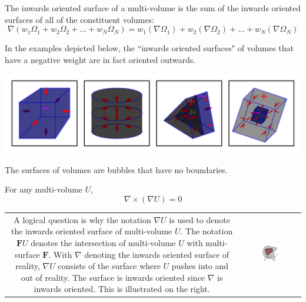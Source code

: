 The inwards oriented surface of a multi-volume is the sum of the inwards oriented surfaces of all of the constituent volumes:
\[\nabla (w_1 \Omega_1 + w_2 \Omega_2 + ... + w_N \Omega_N)
= w_1(\nabla \Omega_1) + w_2(\nabla \Omega_2) + ... + w_N(\nabla \Omega_N)\]

In the examples depicted below, the ``inwards oriented surfaces" of volumes that have a negative weight are in fact oriented outwards.

\begin{center}
\includegraphics[width = \textwidth]{Boundaries/Volume_inwards_oriented_surfaces/volume_surface_examples_2}
\end{center}

The surfaces of volumes are bubbles that have no boundaries. 
\begin{thm}
For any multi-volume \(U\), 
\[\nabla \times (\nabla U) = 0\]
\end{thm} 

\begin{tabular}{cc}
\parbox{0.5\textwidth}{
A logical question is why the notation \(\nabla U\) is used to denote the inwards oriented surface of multi-volume \(U\). The notation \(\mathbf{F} U\) denotes the intersection of multi-volume \(U\) with multi-surface \(\mathbf{F}\). With \(\nabla\) denoting the inwards oriented surface of reality, \(\nabla U\) consists of the surface where \(U\) pushes into and out of reality. The surface is inwards oriented since \(\nabla\) is inwards oriented. This is illustrated on the right.
} & \parbox{0.3\textwidth}{
\includegraphics[width = 0.3\textwidth]{Boundaries/Volume_inwards_oriented_surfaces/surface_volume_intersections_and_volume_surfaces}
}
\end{tabular}



